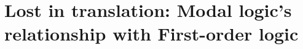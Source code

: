 \chapter[Modal logic's relationship with First-order logic]{Lost in translation: Modal logic's relationship with First-order logic}

\setcounter{section}{-1}

